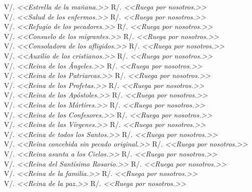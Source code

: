 \documentclass[12pt, letterpaper]{report}
\begin{document}
    \Large V/. \textit{<<Estrella de la mañana.>>} \hfill{R/. \textit{<<Ruega por nosotros.>>}}\\
    \Large V/. \textit{<<Salud de los enfermos.>>} \hfill{R/. \textit{<<Ruega por nosotros.>>}}\\
    \Large V/. \textit{<<Refugio de los pecadores.>>} \hfill{R/. \textit{<<Ruega por nosotros.>>}}\\
    \Large V/. \textit{<<Consuelo de los migrantes.>>} \hfill{R/. \textit{<<Ruega por nosotros.>>}}\\
    \Large V/. \textit{<<Consoladora de los afligidos.>>} \hfill{R/. \textit{<<Ruega por nosotros.>>}}\\
    \Large V/. \textit{<<Auxilio de los cristianos.>>} \hfill{R/. \textit{<<Ruega por nosotros.>>}}\\
    \Large V/. \textit{<<Reina de los Ángeles.>>} \hfill{R/. \textit{<<Ruega por nosotros.>>}}\\
    \Large V/. \textit{<<Reina de los Patriarcas.>>} \hfill{R/. \textit{<<Ruega por nosotros.>>}}\\
    \Large V/. \textit{<<Reina de los Profetas.>>} \hfill{R/. \textit{<<Ruega por nosotros.>>}}\\
    \Large V/. \textit{<<Reina de los Apóstoles.>>} \hfill{R/. \textit{<<Ruega por nosotros.>>}}\\
    \Large V/. \textit{<<Reina de los Mártires.>>} \hfill{R/. \textit{<<Ruega por nosotros.>>}}\\
    \Large V/. \textit{<<Reina de los Confesores.>>} \hfill{R/. \textit{<<Ruega por nosotros.>>}}\\
    \Large V/. \textit{<<Reina de las Vírgenes.>>} \hfill{R/. \textit{<<Ruega por nosotros.>>}}\\
    \Large V/. \textit{<<Reina de todos los Santos.>>} \hfill{R/. \textit{<<Ruega por nosotros.>>}}\\
    \Large V/. \textit{<<Reina concebida sin pecado original.>>} \hfill{R/. \textit{<<Ruega por nosotros.>>}}\\
    \Large V/. \textit{<<Reina asunta a los Cielos.>>} \hfill{R/. \textit{<<Ruega por nosotros.>>}}\\
    \Large V/. \textit{<<Reina del Santísimo Rosario.>>} \hfill{R/. \textit{<<Ruega por nosotros.>>}}\\
    \Large V/. \textit{<<Reina de la familia.>>} \hfill{R/. \textit{<<Ruega por nosotros.>>}}\\
    \Large V/. \textit{<<Reina de la paz.>>} \hfill{R/. \textit{<<Ruega por nosotros.>>}}
    
\end{document}
